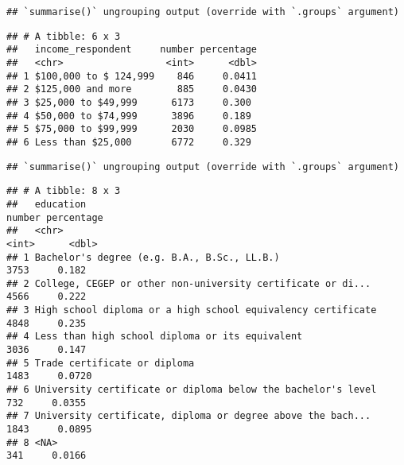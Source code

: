 \documentclass[
]{article}
\newenvironment{Shaded}{\begin{snugshade}}{\end{snugshade}}
\newcommand{\CommentTok}[1]{\textcolor[rgb]{0.56,0.35,0.01}{\textit{#1}}}
\newcommand{\KeywordTok}[1]{\textcolor[rgb]{0.13,0.29,0.53}{\textbf{#1}}}
\newcommand{\NormalTok}[1]{#1}
\newcommand{\OperatorTok}[1]{\textcolor[rgb]{0.81,0.36,0.00}{\textbf{#1}}}
\newcommand{\StringTok}[1]{\textcolor[rgb]{0.31,0.60,0.02}{#1}}
\begin{document}
\begin{Shaded}
\end{Shaded}

\begin{verbatim}
## `summarise()` ungrouping output (override with `.groups` argument)
\end{verbatim}

\begin{verbatim}
## # A tibble: 6 x 3
##   income_respondent     number percentage
##   <chr>                  <int>      <dbl>
## 1 $100,000 to $ 124,999    846     0.0411
## 2 $125,000 and more        885     0.0430
## 3 $25,000 to $49,999      6173     0.300 
## 4 $50,000 to $74,999      3896     0.189 
## 5 $75,000 to $99,999      2030     0.0985
## 6 Less than $25,000       6772     0.329
\end{verbatim}

\begin{Shaded}
\end{Shaded}

\begin{verbatim}
## `summarise()` ungrouping output (override with `.groups` argument)
\end{verbatim}

\begin{verbatim}
## # A tibble: 8 x 3
##   education                                                    number percentage
##   <chr>                                                         <int>      <dbl>
## 1 Bachelor's degree (e.g. B.A., B.Sc., LL.B.)                    3753     0.182 
## 2 College, CEGEP or other non-university certificate or di...    4566     0.222 
## 3 High school diploma or a high school equivalency certificate   4848     0.235 
## 4 Less than high school diploma or its equivalent                3036     0.147 
## 5 Trade certificate or diploma                                   1483     0.0720
## 6 University certificate or diploma below the bachelor's level    732     0.0355
## 7 University certificate, diploma or degree above the bach...    1843     0.0895
## 8 <NA>                                                            341     0.0166
\end{verbatim}
\end{document}
